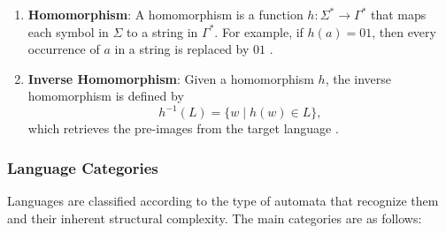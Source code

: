 \begin{enumerate}
    \item \textbf{Homomorphism}: A homomorphism is a function $h: \Sigma^\ast \to \Gamma^\ast$ that maps each symbol in $\Sigma$ to a string in $\Gamma^\ast$. For example, if $h(a) = 01$, then every occurrence of $a$ in a string is replaced by $01$ \cite{hopcroft2006introduction}.

    \item \textbf{Inverse Homomorphism}: Given a homomorphism $h$, the inverse homomorphism is defined by 
    \[
    h^{-1}(L) = \{w \mid h(w) \in L\},
    \]
    which retrieves the pre-images from the target language \cite{hopcroft2006introduction}.
\end{enumerate}

\subsubsection{Language Categories}
Languages are classified according to the type of automata that recognize them and their inherent structural complexity. The main categories are as follows:

